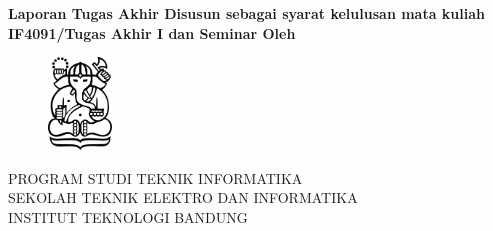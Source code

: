 \clearpage
\pagestyle{empty}

\begin{center}
\smallskip
    \Large \bfseries \MakeUppercase{\thetitle}
    \vfill
    \Large Laporan Tugas Akhir
    \vfill
    \large Disusun sebagai syarat kelulusan mata kuliah \\ IF4091/Tugas Akhir I dan Seminar
    \vfill
    \large Oleh
    \Large \theauthor
    \vfill
    \begin{figure}[h]
        \centering
      	\includegraphics[width=0.15\textwidth]{images/itb-logo}
    \end{figure}
    \vfill
    \large
    \uppercase{
        Program Studi Teknik Informatika \\
        Sekolah Teknik Elektro dan Informatika \\
        Institut Teknologi Bandung
    }

    \thedate
\end{center}
\clearpage
